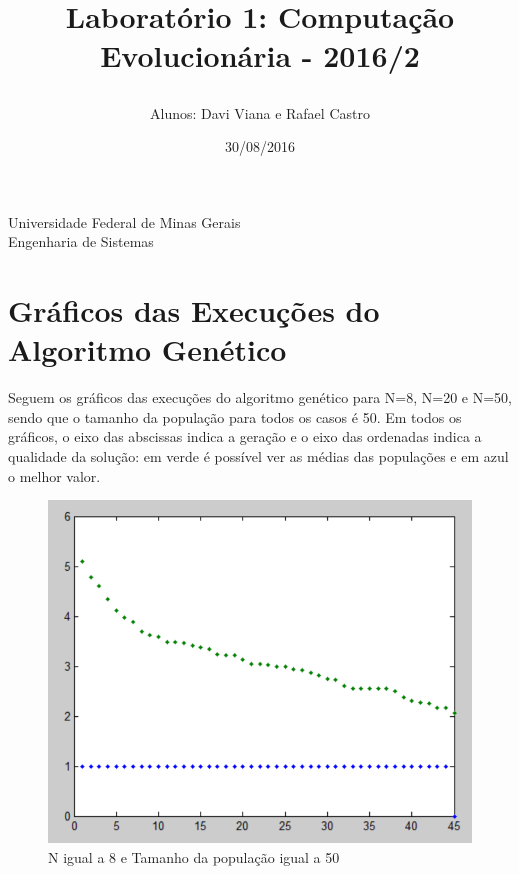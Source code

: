 \documentclass[12pt, a4paper]{article}
\title{
	\begin{large}
		Laboratório 1: Computação Evolucionária - 2016/2
	\end{large}}
\author{Alunos: Davi Viana e Rafael Castro}
\date{30/08/2016}
\begin{document}
	\maketitle
	
	\vspace*{-7.5cm}
	{\bf
		\begin{center}
			{\large
				\hspace*{0cm}Universidade Federal de Minas Gerais} \\
			\hspace*{0cm}Engenharia de Sistemas  \\
		\end{center}
	}
	\vspace*{5cm}
	
\section{Gráficos das Execuções do Algoritmo Genético}
\par Seguem os gráficos das execuções do algoritmo genético para N=8, N=20 e N=50, sendo que o tamanho da população para todos os casos é 50. Em todos os gráficos, o eixo das abscissas indica a geração e o eixo das ordenadas indica a qualidade da solução: em verde é possível ver as médias das populações e em azul o melhor valor.
\begin{figure}[h]
	\centering
	\includegraphics[width=15cm]{img/n8.png}
	\caption{N igual a 8 e Tamanho da população igual a 50}
	\label{fig:n8}
\end{figure}  
\end{document}
